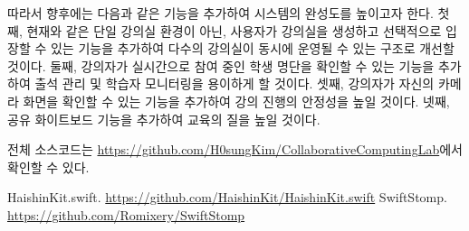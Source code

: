 \documentclass[10pt, a4paper, oneside]{article}
\begin{document}
따라서 향후에는 다음과 같은 기능을 추가하여 시스템의 완성도를 높이고자 한다.
첫째, 현재와 같은 단일 강의실 환경이 아닌, 사용자가 강의실을 생성하고 선택적으로 입장할 수 있는 기능을 추가하여 다수의 강의실이 동시에 운영될 수 있는 구조로 개선할 것이다.
둘째, 강의자가 실시간으로 참여 중인 학생 명단을 확인할 수 있는 기능을 추가하여 출석 관리 및 학습자 모니터링을 용이하게 할 것이다.
셋째, 강의자가 자신의 카메라 화면을 확인할 수 있는 기능을 추가하여 강의 진행의 안정성을 높일 것이다.
넷째, 공유 화이트보드 기능을 추가하여 교육의 질을 높일 것이다.

전체 소스코드는 \href{https://github.com/H0sungKim/CollaborativeComputingLab}{https://github.com/H0sungKim/CollaborativeComputingLab}에서 확인할 수 있다.

\begin{thebibliography}{1}
HaishinKit.swift. \href{https://github.com/HaishinKit/HaishinKit.swift}{https://github.com/HaishinKit/HaishinKit.swift}
SwiftStomp. \href{https://github.com/Romixery/SwiftStomp}{https://github.com/Romixery/SwiftStomp}
\end{thebibliography}
\end{document}
